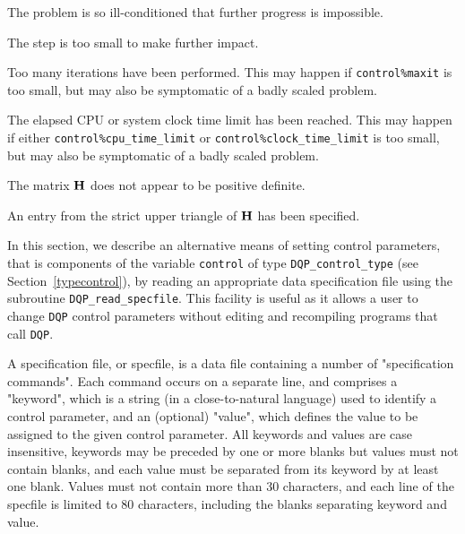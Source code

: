 \documentclass{galahad}
\newcommand{\packagename}{DQP}
\begin{document}
\begin{description}
 The problem is so ill-conditioned that
 further progress is impossible.

 The step is too small to make further impact.

 Too many iterations have been performed.
   This may happen if
    {\tt control\%maxit} is too small, but may also be symptomatic of
    a badly scaled problem.

 The elapsed CPU or system clock time limit has been
    reached. This may happen if either {\tt control\%cpu\_time\_limit} or
    {\tt control\%clock\_time\_limit} is too small, but may also be symptomatic
    of a badly scaled problem.

 The matrix ${\mathbf{H}}$ does not appear to be positive definite.

 An entry from the strict upper triangle of ${\mathbf{H}}$
 has been specified.

\end{description}


\galfeatures
\noindent In this section, we describe an alternative means of setting
control parameters, that is components of the variable {\tt control} of type
{\tt \packagename\_control\_type}
(see Section~\ref{typecontrol}),
by reading an appropriate data specification file using the
subroutine {\tt \packagename\_read\_specfile}. This facility
is useful as it allows a user to change  {\tt \packagename} control parameters
without editing and recompiling programs that call {\tt \packagename}.

A specification file, or specfile, is a data file containing a number of
"specification commands". Each command occurs on a separate line,
and comprises a "keyword",
which is a string (in a close-to-natural language) used to identify a
control parameter, and
an (optional) "value", which defines the value to be assigned to the given
control parameter. All keywords and values are case insensitive,
keywords may be preceded by one or more blanks but
values must not contain blanks, and
each value must be separated from its keyword by at least one blank.
Values must not contain more than 30 characters, and
each line of the specfile is limited to 80 characters,
including the blanks separating keyword and value.
\end{document}
